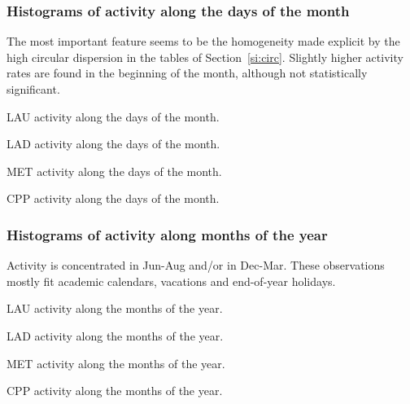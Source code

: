\FloatBarrier
\subsubsection{Histograms of activity along the days of the month}\label{si:monthdays}
The most important feature seems to be the homogeneity made explicit by the high circular dispersion in the tables of Section~\ref{si:circ}. Slightly higher activity rates are found in the beginning of the month, although not statistically significant.
\begin{table}[!h]
	\caption{LAU activity along the days of the month.}
	\footnotesize
	
\label{tab:min}
\end{table}
\begin{table}[!h]
	\caption{LAD activity along the days of the month.}
	\footnotesize
	
\label{tab:min}
\end{table}
\begin{table}[!h]
	\caption{MET activity along the days of the month.}
	\footnotesize
	
\label{tab:min}
\end{table}
\begin{table}[!h]
	\caption{CPP activity along the days of the month.}
	\footnotesize
	
\label{tab:min}
\end{table}

\FloatBarrier
\subsubsection{Histograms of activity along months of the year}\label{si:months}
	Activity is concentrated in Jun-Aug and/or in Dec-Mar.
	These observations mostly fit academic calendars, vacations and end-of-year holidays.
\begin{table}[!h]
	\caption{LAU activity along the months of the year.}
	\footnotesize
	
\label{tab:min2}
\end{table}
\begin{table}[!h]
	\caption{LAD activity along the months of the year.}
	\footnotesize
	
\label{tab:min2}
\end{table}
\begin{table}[!h]
	\caption{MET activity along the months of the year.}
	\footnotesize
	
\label{tab:min2}
\end{table}

\begin{table}[!h]
	\caption{CPP activity along the months of the year.}
	\footnotesize
	
\label{tab:min2}
\end{table}


